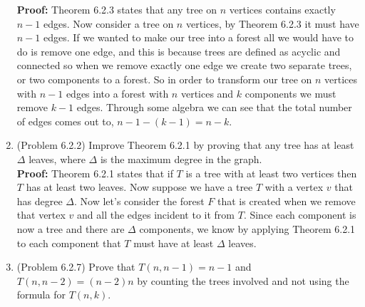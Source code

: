 \documentclass{amsart}
\begin{document}
\begin{enumerate}
\textbf{Proof:} Theorem 6.2.3 states that any tree on $n$ vertices contains exactly $n-1$ edges. Now consider a tree on $n$ vertices, by Theorem 6.2.3 it must have $n-1$ edges. If we wanted to make our tree into a forest all we would have to do is remove one edge, and this is because trees are defined as acyclic and connected so when we remove exactly one edge we create two separate trees, or two components to a forest. So in order to transform our tree on $n$ vertices with $n-1$ edges into a forest with $n$ vertices and $k$ components we must remove $k-1$ edges. Through some algebra we can see that the total number of edges comes out to, $n-1-(k-1) = n-k$. 

\vspace{1in}

\item (Problem 6.2.2) Improve Theorem 6.2.1 by proving that any tree has at least $\Delta$ leaves, where $\Delta$ is the maximum degree in the graph.\\

\textbf{Proof:} Theorem 6.2.1 states that if $T$ is a tree with at least two vertices then $T$ has at least two leaves. Now suppose we have a tree $T$ with a vertex $v$ that has degree $\Delta$. Now let's consider the forest $F$ that is created when we remove that vertex $v$ and all the edges incident to it from $T$. Since each component is now a tree and there are $\Delta$ components, we know by applying Theorem 6.2.1 to each component that $T$ must have at least $\Delta$ leaves. 

\vspace{.5in}

\item (Problem 6.2.7) Prove that $T(n,n-1)=n-1$ and $T(n,n-2)=(n-2)n$ by counting the trees involved and not using the formula for $T(n,k).$\\


\end{enumerate}
\end{document}

